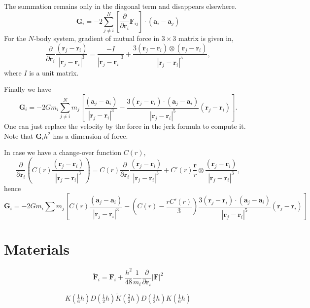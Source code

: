 \documentclass[11pt]{jsarticle}
\begin{document}
The summation remains only in the diagonal term and disappears elsewhere.
\begin{equation}
\bm G_i = -2 \sum_{j \neq i}^N \left[ \frac{\partial}{\partial \bm r_i} \bm F_{ij} \right] \cdot \left(\bm a_i - \bm a_j\right)
\end{equation}
For the $N$-body system, gradient of mutual force in $3 \times 3$ matrix is given in,
\begin{equation}
\frac{\partial}{\partial \bm r_i} \frac{(\bm r_j - \bm r_i)}{| \bm r_j - \bm r_i |^3}
=
\frac{-I}{| \bm r_j - \bm r_i |^3}
+
\frac{3 (\bm r_j - \bm r_i) \otimes (\bm r_j - \bm r_i)}{| \bm r_j - \bm r_i |^5},
\end{equation}
where $I$ is a unit matrix.

Finally we have
\begin{equation}
\bm G_i = -2 G m_i \sum_{j \neq i}^N 
  m_j \left[ \frac{(\bm a_j - \bm a_i)}{| \bm r_j - \bm r_i |^3} - \frac{3 (\bm r_j - \bm r_i) \cdot (\bm a_j - \bm a_i)}{| \bm r_j - \bm r_i |^5} (\bm r_j - \bm r_i) \right].
\end{equation}
One can just replace the velocity by the force in the jerk formula to compute it.
Note that $\bm G_i h^2$ has a dimension of force.

In case we have a change-over function $C(r)$,
\begin{equation}
\frac{\partial}{\partial \bm r_i} \left( C(r) \frac{(\bm r_j - \bm r_i)}{| \bm r_j - \bm r_i |^3} \right)
=
C(r) \frac{\partial}{\partial \bm r_i} \frac{(\bm r_j - \bm r_i)}{| \bm r_j - \bm r_i |^3}
+ C'(r) \frac{\bm r}{r} \otimes \frac{(\bm r_j - \bm r_i)}{| \bm r_j - \bm r_i |^3},
\end{equation}
hence
\begin{equation}
\bm G_i = -2Gm_i \sum m_j \left[
	C(r) \frac{(\bm a_j - \bm a_i)}{| \bm r_j - \bm r_i |^3}
	- \left( C(r) - \frac{r C'(r)}{3} \right)
	\frac{3 (\bm r_j - \bm r_i) \cdot (\bm a_j - \bm a_i)}{| \bm r_j - \bm r_i |^5} (\bm r_j - \bm r_i)
	\right]
	\label{eq:p3tgrad}
\end{equation}

\section{Materials}
\[
\tilde{ \bm F}_i = \bm F_i + \frac{h^2}{48} \frac{1}{m_i} \frac{\partial}{\partial \bm r_i} \left| \bm F \right|^2
\]

\[
	K(\tfrac16 h) D(\tfrac12 h) \tilde K(\tfrac23 h) D(\tfrac12 h) K(\tfrac16 h)
\]
\end{document}

